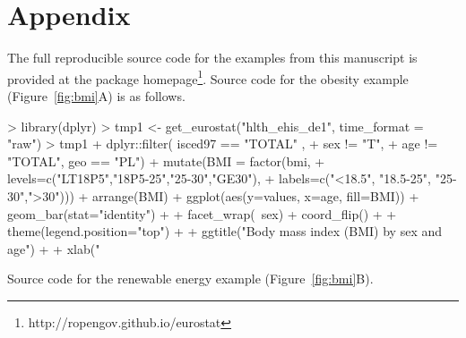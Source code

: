 \address{Przemys{\l}aw Biecek\\
  Faculty of Mathematics and Information Science\\
  Warsaw University of Technology\\
  Koszykowa 75, 00-662 Warsaw\\
  Poland\\}

\newpage

\section{Appendix}

The full reproducible source code for the examples from this manuscript is provided at the package homepage\footnote{http://ropengov.github.io/eurostat}. Source code for the obesity example (Figure~\ref{fig:bmi}A) is as follows.

\begin{example}
> library(dplyr)
> tmp1 <- get_eurostat("hlth_ehis_de1", time_format = "raw")
> tmp1 %
+  dplyr::filter( isced97 == "TOTAL" ,
+          sex != "T",
+          age != "TOTAL", geo == "PL") %
+  mutate(BMI = factor(bmi, 
+                      levels=c("LT18P5","18P5-25","25-30","GE30"), 
+                      labels=c("<18.5", "18.5-25", "25-30",">30"))) %
+  arrange(BMI) %
+  ggplot(aes(y=values, x=age, fill=BMI)) + geom_bar(stat="identity") +
+  facet_wrap(~sex) + coord_flip() +
+  theme(legend.position="top") +
+  ggtitle("Body mass index (BMI) by sex and age") +
+  xlab("%
\end{example}


Source code for the renewable energy example (Figure~\ref{fig:bmi}B).


